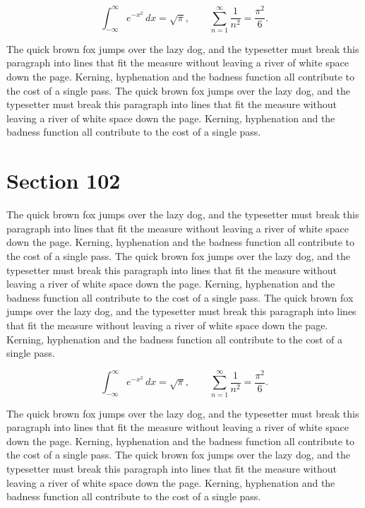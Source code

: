 \documentclass{article}
\begin{document}
\begin{equation}
\int_{-\infty}^{\infty} e^{-x^{2}}\,dx = \sqrt{\pi}, \qquad
\sum_{n=1}^{\infty} \frac{1}{n^{2}} = \frac{\pi^{2}}{6}.
\end{equation}

The quick brown fox jumps over the lazy dog, and the typesetter must break this paragraph into lines that fit the measure without leaving a river of white space down the page. Kerning, hyphenation and the badness function all contribute to the cost of a single pass. The quick brown fox jumps over the lazy dog, and the typesetter must break this paragraph into lines that fit the measure without leaving a river of white space down the page. Kerning, hyphenation and the badness function all contribute to the cost of a single pass. 
\section{Section 102}
The quick brown fox jumps over the lazy dog, and the typesetter must break this paragraph into lines that fit the measure without leaving a river of white space down the page. Kerning, hyphenation and the badness function all contribute to the cost of a single pass. The quick brown fox jumps over the lazy dog, and the typesetter must break this paragraph into lines that fit the measure without leaving a river of white space down the page. Kerning, hyphenation and the badness function all contribute to the cost of a single pass. The quick brown fox jumps over the lazy dog, and the typesetter must break this paragraph into lines that fit the measure without leaving a river of white space down the page. Kerning, hyphenation and the badness function all contribute to the cost of a single pass. 

\begin{equation}
\int_{-\infty}^{\infty} e^{-x^{2}}\,dx = \sqrt{\pi}, \qquad
\sum_{n=1}^{\infty} \frac{1}{n^{2}} = \frac{\pi^{2}}{6}.
\end{equation}

The quick brown fox jumps over the lazy dog, and the typesetter must break this paragraph into lines that fit the measure without leaving a river of white space down the page. Kerning, hyphenation and the badness function all contribute to the cost of a single pass. The quick brown fox jumps over the lazy dog, and the typesetter must break this paragraph into lines that fit the measure without leaving a river of white space down the page. Kerning, hyphenation and the badness function all contribute to the cost of a single pass. 
\end{document}

